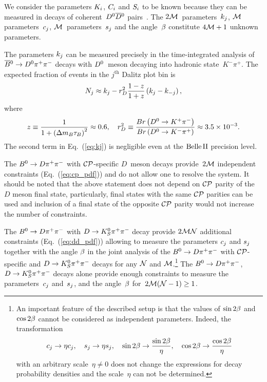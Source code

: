 \documentclass[a4paper,11pt]{article}
\begin{document}
We consider the parameters $K_i$, $C_i$ and $S_i$ to be known because they 
can be measured in decays of coherent~$D^0\overline{D}{}^0$ pairs~\cite{CLEO_phasees}.  
The $2\mathcal{M}$~parameters~$k_j$, $\mathcal{M}$ parameters~$c_j$, $\mathcal{M}$~parameters~$s_j$ 
and the angle~$\beta$ constitute $4\mathcal{M}+1$ unknown parameters.  

The parameters $k_j$ can be measured precisely in the time-integrated analysis 
of $\overline{B}{}^0\to D^0\pi^+\pi^-$ decays with $D^0$~meson decaying into hadronic state~$K^-\pi^+$.  
The expected fraction of events in the $j^{\mathrm{th}}$ Dalitz plot bin is
\begin{equation}\label{eq:kj}
 N_j \approx k_j - r_D^2\frac{1-z}{1+z}\left(k_j - k_{-j}\right),
\end{equation}
where
\begin{equation}
 z\equiv \frac{1}{1 + \left(\Delta m_B\tau_B\right)^2}\approx 0.6,\quad
 r_D^2\equiv \frac{Br\left(D^0\to K^+\pi^-\right)}
                  {Br\left(D^0\to K^-\pi^+\right)}\approx 3.5\times 10^{-3}.
\end{equation}
The second term in Eq.~(\ref{eq:kj}) is negligible even at the $\mathrm{Belle}\,\mathrm{II}$ 
precision level.

The $B^0\to D\pi^+\pi^-$ with $\mathcal{CP}$-specific $D$~meson decays provide~$2\mathcal{M}$ 
independent constraints (Eq.~(\ref{eq:cp_pdf})) and do not allow one to 
resolve the system.  It should be noted that the above statement does 
not depend on $\mathcal{CP}$ parity of the $D$ meson final state, particularly, 
final states with the same $\mathcal{CP}$ parities can be used and inclusion of 
a final state of the opposite $\mathcal{CP}$ parity would not increase the 
number of constraints.

The $B^0\to D\pi^+\pi^-$ with $D\to K_S^0\pi^+\pi^-$ decay provide $2\mathcal{M}\mathcal{N}$ additional constraints 
(Eq.~(\ref{eq:dd_pdf})) allowing to measure the parameters $c_j$ and 
$s_j$ together with the angle $\beta$ in the joint analysis of the 
$B^0\to D\pi^+\pi^-$ with $\mathcal{CP}$-specific and $D\to K_S^0\pi^+\pi^-$ decays for 
any $\mathcal{N}$ and $\mathcal{M}$.\footnote{
An important feature of the described setup is that the values of 
$\sin{2\beta}$ and $\cos{2\beta}$ cannot be considered as independent parameters. 
Indeed, the transformation
\begin{equation}\label{eq:scale}
  c_j\to \eta c_j,\quad s_j\to \eta s_j,\quad
  \sin{2\beta}\to\frac{\sin{2\beta}}{\eta},\quad\cos{2\beta}\to\frac{\cos{2\beta}}{\eta}
\end{equation}
with an arbitrary scale~$\eta\neq 0$ does not change the expressions for 
decay probability densities and the scale~$\eta$ can not be determined.}
The $B^0\to D\pi^+\pi^-$, $D\to K_S^0\pi^+\pi^-$ decays alone provide enough constraints 
to measure the parameters~$c_j$ and~$s_j$, and the angle~$\beta$ 
for~$2\mathcal{M}(\mathcal{N}-1)\geq1$.
\end{document}
